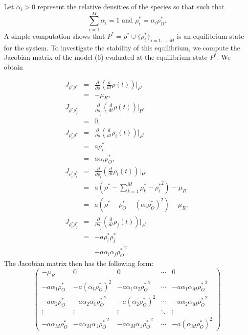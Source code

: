 \documentclass[8pt,a4paper]{article}
\begin{document}
Let $\alpha_i >0$ represent the relative densities of the species so that
such that $$\sum_{i=1}^M \alpha_i =1 \mbox{ and } \rho_i^*=\alpha_i \rho_O^*.$$
A simple computation shows that $P^*=  \rho^* \cup \{\rho_i^*\}_{i= 1, \ldots,M}$ is an equilibrium state for the system.  To investigate the stability of this equilibrium, we compute the Jacobian matrix of  the model  (6) evaluated at the equilibrium state $ P^*$.  We obtain

\begin{eqnarray*}
J_{\rho^*\rho^*} &=& \frac{\partial }{\partial \rho } \left( \frac{d}{dt}\rho(t) \right) \bigg|_{P^*}\\
 			& = &  - \mu_R, \\
J_{\rho^* \rho_j^*} &=&  \frac{\partial }{\partial \rho_j } \left( \frac{d}{dt}\rho(t) \right) \bigg|_{P^*}\\
			&=& 0,\\
J_{\rho_i^* \rho^*} &= &  \frac{\partial }{\partial \rho } \left( \frac{d}{dt}\rho_i(t) \right) \bigg|_{P^*}\\ 
			& =& a \rho_i^* \\
			& =&  a \alpha_i \rho_O^*, \\
J_{\rho_i^*\rho_i^*}&=&  \frac{\partial }{\partial \rho_i } \left( \frac{d}{dt}\rho_i(t) \right) \bigg|_{P^*}\\ 
			& = & a \left( \rho^*-\sum_{k=1}^M \rho_k^* -{\rho_i^*}^2\right) -\mu_R \\
			&=& a \left(\rho^*-\rho_O^* - {(\alpha_i \rho_O^*)}^2 \right)- \mu_R, \\
J_{\rho_i^*\rho_j^*}&=&  \frac{\partial }{\partial \rho_j } \left( \frac{d}{dt}\rho_j(t) \right) \bigg|_{P^*}\\
			& = & -a\rho_i^* \rho_j^* \\
			&=& -a \alpha_i \alpha_j {\rho_O^*}^2.
\end{eqnarray*}
The Jacobian matrix then has the following form:
\[ \left( 
\begin{array}{ccccc}
-\mu_R & 0 & 0 & \cdots & 0 \\
- a \alpha_1 \rho_O^* & -a {(\alpha_1 \rho_O^*)}^2 & - a \alpha_1 \alpha_2 {\rho_O^*}^2 & \cdots & -a \alpha_1 \alpha_M {\rho_O^*}^2 \\
- a \alpha_2 \rho_O^* & -a \alpha_2 \alpha_1 {\rho_O^*}^2 & - a {(\alpha_2 \rho_O^*)}^2 & \cdots & -a \alpha_2 \alpha_M {\rho_O^*}^2 \\
\vdots & \vdots &\vdots& \ddots & \vdots \\
- a \alpha_M \rho_O^* & -a \alpha_M \alpha_1 {\rho_O^*}^2 & - a \alpha_M \alpha_1 {\rho_O^*}^2 & \cdots & -a {(\alpha_M\rho_O^*)}^2 
\end{array} 
\right)\] 
\end{document}
